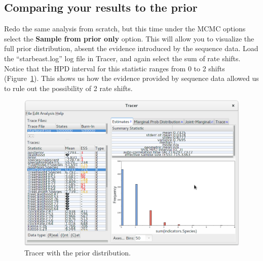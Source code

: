 \documentclass{article}
\begin{document}
\subsection*{Comparing your results to the prior}

Redo the same analysis from scratch, but this time under the MCMC options select
the \textbf{Sample from prior only} option. This will allow you to visualize the
full prior distribution, absent the evidence introduced by the sequence data.
Load the ``starbeast.log'' log file in Tracer, and again select the sum of rate
shifts. Notice that the HPD interval for this statistic ranges from 0 to 2
shifts (Figure~\ref{fig:tracerPrior}). This shows us how the evidence provided
by sequence data allowed us to rule out the possibility of 2 rate shifts.

\begin{figure}[htb!]
\centering
\includegraphics[width=\textwidth]{figures/tracer-prior.png}
\caption{Tracer with the prior distribution.}
\label{fig:tracerPrior}
\end{figure}

\clearpage



\end{document}

